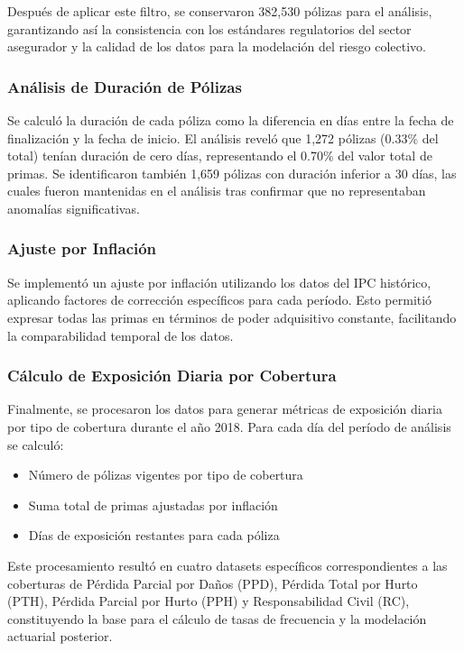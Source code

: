 Después de aplicar este filtro, se conservaron 382,530 pólizas para el análisis, garantizando así la consistencia con los estándares regulatorios del sector asegurador y la calidad de los datos para la modelación del riesgo colectivo.

\subsubsection{Análisis de Duración de Pólizas}

Se calculó la duración de cada póliza como la diferencia en días entre la fecha de finalización y la fecha de inicio. El análisis reveló que 1,272 pólizas (0.33\% del total) tenían duración de cero días, representando el 0.70\% del valor total de primas. Se identificaron también 1,659 pólizas con duración inferior a 30 días, las cuales fueron mantenidas en el análisis tras confirmar que no representaban anomalías significativas.

\subsubsection{Ajuste por Inflación}

Se implementó un ajuste por inflación utilizando los datos del IPC histórico, aplicando factores de corrección específicos para cada período. Esto permitió expresar todas las primas en términos de poder adquisitivo constante, facilitando la comparabilidad temporal de los datos.

\subsubsection{Cálculo de Exposición Diaria por Cobertura}

Finalmente, se procesaron los datos para generar métricas de exposición diaria por tipo de cobertura durante el año 2018. Para cada día del período de análisis se calculó:

\begin{itemize}
    \item Número de pólizas vigentes por tipo de cobertura
    \item Suma total de primas ajustadas por inflación
    \item Días de exposición restantes para cada póliza
\end{itemize}

Este procesamiento resultó en cuatro datasets específicos correspondientes a las coberturas de Pérdida Parcial por Daños (PPD), Pérdida Total por Hurto (PTH), Pérdida Parcial por Hurto (PPH) y Responsabilidad Civil (RC), constituyendo la base para el cálculo de tasas de frecuencia y la modelación actuarial posterior.
